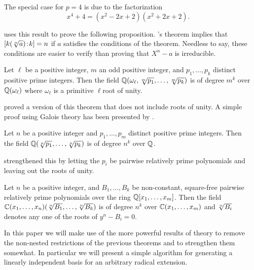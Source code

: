 \noindent
The special case for $p=4$ is due to the factorization 
\[
x^4+4 = (x^2-2x+2)(x^2+2x+2).
\]

{\Caviness} uses this result to prove the following proposition.
{\Capelli}'s theorem implies that $\fieldDegree{k(\root n\of{a})}{k} =
n$ if $a$ satisfies the conditions of the theorem.  Needless to say,
these conditions are easier to verify than proving that $X^n -a$ is
irreducible.

\begin{proposition}
Let $\ell$ be a positive integer, $m$ an odd positive integer, and
$p_1, \ldots, p_k$ distinct positive prime integers.  Then the field
$\Q(\omega_{\ell}, \root m \of {p_1}, \ldots, \root m \of {p_k})$ is
of degree $m^k$ over $\mathbb{Q}(\omega_{\ell})$ where $\omega_{\ell}$ is a
primitive $\ell$\th root of unity.
\end{proposition}

{\Besicovitch} \cite{Besicovitch:Radicals} proved a version of this
theorem that does not include roots of unity.  A simple proof using
Galois theory has been presented by {\Richards} \cite{Richards:Radicals}.

\begin{proposition}
Let $n$ be a positive integer and $p_1, \ldots, p_m$ distinct positive
prime integers.  Then the field $\Q(\root n\of{p_1}, \ldots, \root
n\of{p_k})$ is of degree $n^k$ over $\mathbb{Q}$.
\end{proposition}

\noindent
{\Fateman} strengthened this by letting the $p_i$ be pairwise
relatively prime polynomials and leaving out the roots of unity.

\begin{proposition}
Let $n$ be a positive integer, and $B_1,\ldots, B_k$ be non-constant,
square-free pairwise relatively prime polynomials over the ring
$\mathbb{Q}[x_1, \ldots, x_m]$.  Then the field $\C(x_1, \ldots, x_n)(\root n
\of {B_1}, \ldots, \root n \of {B_k})$ is of degree $n^k$ over
$\mathbb{C}(x_1, \ldots, x_m)$ and $\root n \of {B_i}$ denotes any one of the
roots of $y^n - B_i = 0$.
\end{proposition}

In this paper we will make use of the more powerful results of
{\Kummer} theory to remove the non-nested restrictions of the previous
theorems and to strengthen them somewhat.  In particular we will
present a simple algorithm for generating a linearly independent basis
for an arbitrary radical extension.

